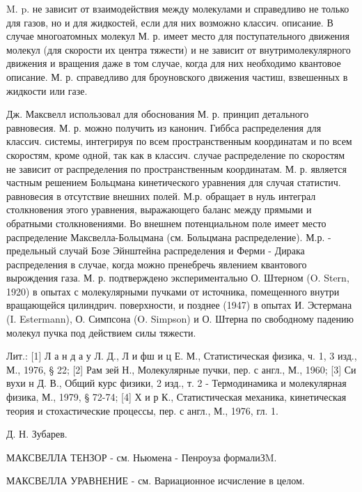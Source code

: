 \documentclass[10pt]{article}
\begin{document}
M. p. не зависит от взаимодействия между молекулами и справедливо не только для газов, но и для жидкостей, если для них возможно классич. описание. В случае многоатомных молекул М. р. имеет место для поступательного движения молекул (для скорости их центра тяжести) и не зависит от внутримолекулярного движения и вращения даже в том случае, когда для них необходимо квантовое описание. М. р. справедливо для броуновского движения частиш, взвешенных в жидкости или газе.



Дж. Максвелл использовал для обоснования М. р. принцип детального равновесия. М. р. можно получить из канонич. Гиббса распределения для классич. системы, интегрируя по всем пространственным координатам и по всем скоростям, кроме одной, так как в классич. случае распределение по скоростям не зависит от распределения по пространственным координатам. М. р. является частным решением Больцмана кинетического уравнения для случая статистич. равновесия в отсутствие внешних полей. М.р. обращает в нуль интеграл столкновения этого уравнения, выражающего баланс между прямыми и обратными столкновениями. Во внешнем потенциальном поле имеет место распределение Максвелла-Больцмана (см. Больцмана распределение). М.р. - предельный случай Бозе Эйнштейна распределения и Ферми - Дирака распределения в случае, когда можно пренебречь явлением квантового вырождения газа. М. р. подтверждено экспериментально О. Штерном (O. Stern, 1920) в опытах с молекулярными пучками от источника, помещенного внутри вращающейся цилиндрич. поверхности, и позднее (1947) в опытах И. Эстермана (I. Estermann), О. Симпсона (O. Simpson) и О. Штерна по свободному падению молекул пучка под действием силы тяжести.



Лит.: [1] Л а н д а у Л. Д., Л и фш и ц Е. М., Статистическая физика, ч. 1, 3 изд., М., 1976, § 22; [2] Рам зей Н., Молекулярные пучки, пер. с англ., М., 1960; [3] Си вухи н Д. В., Общий курс физики, 2 изд., т. 2 - Термодинамика и молекулярная физика, М., 1979, § 72-74; [4] Х и р К., Статистическая механика, кинетическая теория и стохастические процессы, пер. с англ., М., 1976, гл. 1.



Д. Н. Зубарев.



МАКСВЕЛЛА ТЕНЗОР - см. Ньюмена - Пенроуза формалиЗM.



МАКСВЕЛЛА УРАВНЕНИЕ - см. Вариационное исчисление в целом.
\end{document}
